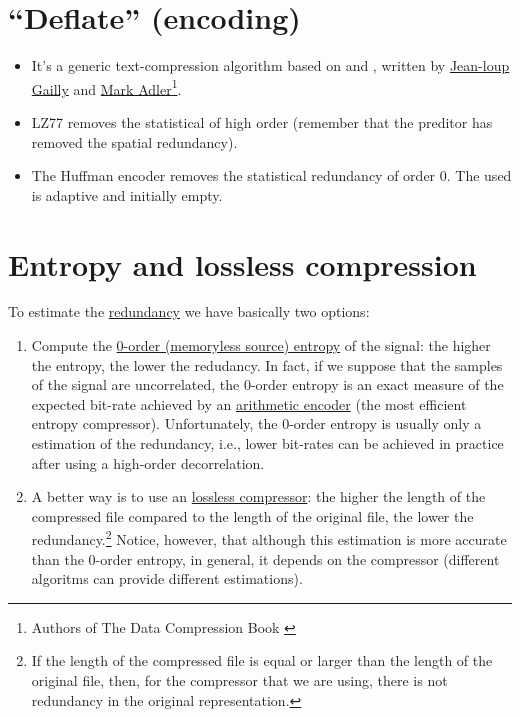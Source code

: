 \section{``Deflate'' (encoding)}
\begin{itemize}
\item It's a generic text-compression algorithm based on
   and ,
  written by
  \href{https://en.wikipedia.org/wiki/Jean-loup_Gailly}{Jean-loup
    Gailly} and \href{https://en.wikipedia.org/wiki/Mark_Adler}{Mark
    Adler}\footnote{Authors of The Data Compression Book
    \cite{nelson96datacompression}}.
\item LZ77 removes the statistical  of
  high order (remember that the preditor has removed the spatial
  redundancy).
\item The Huffman encoder removes the statistical redundancy of order
  0. The  used is
  adaptive and initially empty.
\end{itemize}

\section{Entropy and lossless compression}
To estimate the
\href{https://en.wikipedia.org/wiki/Redundancy_(information_theory)}{redundancy}
we have basically two options:
\begin{enumerate}
\item Compute the
  \href{https://en.wikipedia.org/wiki/Entropy_(information_theory)}{0-order
    (memoryless source) entropy} of the signal: the higher the
  entropy, the lower the redudancy. In fact, if we suppose that the
  samples of the signal are uncorrelated, the 0-order entropy is an
  exact measure of the expected bit-rate achieved by an
  \href{https://en.wikipedia.org/wiki/Arithmetic_coding}{arithmetic
    encoder} (the most efficient entropy compressor). Unfortunately,
  the 0-order entropy is usually only a estimation of the redundancy,
  i.e., lower bit-rates can be achieved in practice after using a high-order
  decorrelation.
\item A better way is to use an
  \href{https://en.wikipedia.org/wiki/Data_compression}{lossless
    compressor}: the higher the length of the compressed file compared
  to the length of the original file, the lower the
  redundancy.\footnote{If the length of the compressed file is equal or
  larger than the length of the original file, then, for the compressor
  that we are using, there is not redundancy in the original
  representation.} Notice, however, that although this estimation is
  more accurate than the 0-order entropy, in general, it depends on the
  compressor (different algoritms can provide different
  estimations).
\end{enumerate}

